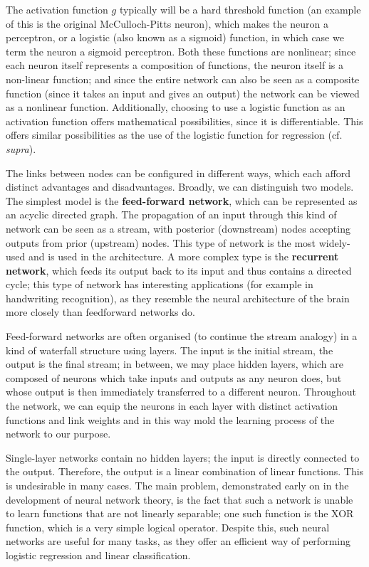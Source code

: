The activation function $g$ typically will be a hard threshold
function (an example of this is the original McCulloch-Pitts neuron),
which makes the neuron a perceptron, or a logistic (also known as a
sigmoid) function, in which case we term the neuron a sigmoid
perceptron. Both these functions are nonlinear; since each neuron
itself represents a composition of functions, the neuron itself is a
non-linear function; and since the entire network can also be seen as
a composite function (since it takes an input and gives an output) the
network can be viewed as a nonlinear function. Additionally, choosing
to use a logistic function as an activation function offers
mathematical possibilities, since it is differentiable. This offers
similar possibilities as the use of the logistic function for
regression (cf. \textit{supra}).

The links between nodes can be configured in different ways, which
each afford distinct advantages and disadvantages. Broadly, we can
distinguish two models. The simplest model is the \textbf{feed-forward
network}, which can be represented as an acyclic directed graph. The
propagation of an input through this kind of network can be seen as a
stream, with posterior (downstream) nodes accepting outputs from prior
(upstream) nodes. This type of network is the most widely-used and is
used in the architecture. A more complex type is the \textbf{recurrent
network}, which feeds its output back to its input and thus contains a
directed cycle; this type of network has interesting applications (for
example in handwriting recognition), as they resemble the neural
architecture of the brain more closely than feedforward networks do.

Feed-forward networks are often organised (to continue the stream
analogy) in a kind of waterfall structure using layers. The input is
the initial stream, the output is the final stream; in between, we may
place hidden layers, which are composed of neurons which take inputs
and outputs as any neuron does, but whose output is then immediately
transferred to a different neuron. Throughout the network, we can
equip the neurons in each layer with distinct activation functions and
link weights and in this way mold the learning process of the network
to our purpose.

Single-layer networks contain no hidden layers; the input is directly
connected to the output. Therefore, the output is a linear combination
of linear functions. This is undesirable in many cases. The main
problem, demonstrated early on in the development of neural network
theory, is the fact that such a network is unable to learn functions
that are not linearly separable; one such function is the XOR
function, which is a very simple logical operator. Despite this, such
neural networks are useful for many tasks, as they offer an efficient
way of performing logistic regression and linear classification.

